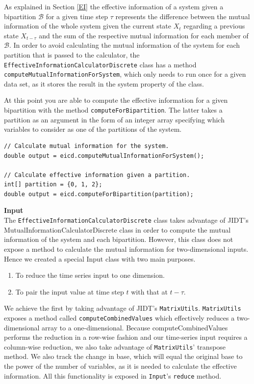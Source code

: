 \documentclass[a4paper,11pt]{article}
\begin{document}
As explained in Section \ref{EI} the effective information of a system given a bipartition $\mathcal{B}$ for a given time step $\tau$ represents the difference between the mutual information of the whole system given the current state $X_t$ regarding a previous state $X_{t-\tau}$ and the sum of the respective mutual information for each member of $\mathcal{B}$. In order to avoid calculating the mutual information of the system for each partition that is passed to the calculator, the \texttt{EffectiveInformationCalculatorDiscrete} class has a method \texttt{computeMutualInformationForSystem}, which only needs to run once for a given data set, as it stores the result in the system property of the class.

At this point you are able to compute the effective information for a given bipartition with the method \texttt{computeForBipartition}. The latter takes a partition as an argument in the form of an integer array specifying which variables to consider as one of the partitions of the system.

\begin{verbatim}
// Calculate mutual information for the system.
double output = eicd.computeMutualInformationForSystem();

// Calculate effective information given a partition.
int[] partition = {0, 1, 2};
double output = eicd.computeForBipartition(partition);
\end{verbatim}


\noindent \textbf{Input}\\

\noindent The \texttt{EffectiveInformationCalculatorDiscrete} class takes advantage of JIDT's MutualInformationCalculatorDiscrete class in order to compute the mutual information of the system and each bipartition. However, this class does not expose a method to calculate the mutual information for two-dimensional inputs. Hence we created a special Input class with two main purposes.

\begin{enumerate}
\item{To reduce the time series input to one dimension.}
\item{To pair the input value at time step $t$ with that at $t-\tau$.}
\end{enumerate}

We achieve the first by taking advantage of JIDT's \texttt{MatrixUtils}. \texttt{MatrixUtils} exposes a method called \texttt{computeCombinedValues} which effectively reduces a two-dimensional array to a one-dimensional. Because computeCombinedValues performs the reduction in a row-wise fashion and our time-series input requires a column-wise reduction, we also take advantage of \texttt{MatrixUtils}' transpose method. We also track the change in base, which will equal the original base to the power of the number of variables, as it is needed to calculate the effective information. All this functionality is exposed in \texttt{Input}'s \texttt{reduce} method.
\end{document}
